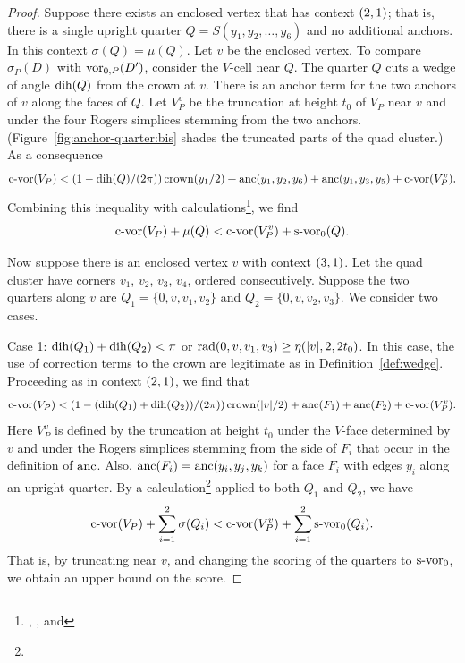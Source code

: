 \begin{proof}
%
Suppose there exists an enclosed vertex that has context
$\relax(2,1)$; that is, there is a single upright quarter
$Q=S(y_1,y_2,\ldots,y_6)$ and no additional anchors.  In this
context $\sigma(Q)=\mu(Q)$. Let $v$ be the enclosed vertex.  To
compare $\sigma_P(D)$ with $\operatorname{vor}_{0,P}(D')$, consider the $V$-cell
near $Q$. The quarter $Q$ cuts a wedge of angle $\operatorname{dih}(Q)$ from the
crown at $v$. There is an anchor term for the two anchors of $v$
along the faces of $Q$. Let $V_P^v$ be the truncation at height
$t_0$ of $V_P$ near $v$ and under the four Rogers simplices
stemming from the two anchors.
(Figure~\ref{fig:anchor-quarter:bis} shades the truncated parts of
the quad cluster.) As a consequence
\smallskip
    \begin{equation}
        {\operatorname{c-vor}}(V_P) <(1-\operatorname{dih}(Q)/(2\pi))\operatorname{crown}(y_1/2)+\operatorname{anc}(y_1,y_2,y_6)
        +\operatorname{anc}(y_1,y_3,y_5) +{\operatorname{c-vor}}(V_P^v).
    \label{eqn:4.8}
    \end{equation}
Combining this inequality with
calculations\footnote{, , and
}, we find
    \begin{equation}
        {\operatorname{c-vor}}(V_P) +\mu(Q) < {\operatorname{c-vor}}(V_P^v) +\operatorname{s-vor}_0(Q).
        \label{eqn:4.9}
    \end{equation}

Now suppose there is an enclosed vertex $v$ with context
$\relax(3,1)$. Let the quad cluster have corners $v_1$, $v_2$, $v_3$,
$v_4$, ordered consecutively.  Suppose the two quarters along $v$
are $Q_1=\{0,v,v_1,v_2\}$ and $Q_2=\{0,v,v_2,v_3\}$.  We consider
two cases.

\noindent Case 1:  $\operatorname{dih}(Q_1)+\operatorname{dih}(Q_2)<\pi$ or
$\operatorname{rad}(0,v,v_1,v_3)\ge\eta(|v|,2,2t_0)$. In this case, the use of
correction terms to the crown are legitimate as in
Definition~\ref{def:wedge}. Proceeding as in context $\relax(2,1)$, we
find that
\smallskip
    \begin{equation}
    {\operatorname{c-vor}}(V_P) < (1-(\operatorname{dih}(Q_1)+\operatorname{dih}(Q_2))/(2\pi))\operatorname{crown}(|v|/2)
    +\operatorname{anc}(F_1) +\operatorname{anc}(F_2) +{\operatorname{c-vor}}(V_P^v).
    \label{eqn:4.10}
    \end{equation}
Here $V_P^v$ is defined by the truncation at height $t_0$
 under the $V$-face determined by $v$ and
under the Rogers simplices stemming from the side of $F_i$ that
occur in the definition of $\operatorname{anc}$. Also,
$\operatorname{anc}(F_i)=\operatorname{anc}(y_i,y_j,y_k)$ for a face $F_i$ with edges $y_i$
along an upright quarter. By a
calculation\footnote{} applied to both $Q_1$ and
$Q_2$, we have
    \begin{equation}
    {\operatorname{c-vor}}(V_P) +\sum_{i=1}^2\sigma(Q_i)
    < {\operatorname{c-vor}}(V_P^v) + \sum_{i=1}^2 \operatorname{s-vor}_0(Q_i).
    \label{eqn:4.11}
    \end{equation}
That is, by truncating near $v$, and changing the scoring of the
quarters to $\operatorname{s-vor}_0$, we obtain an upper bound on the score.


\end{proof}
